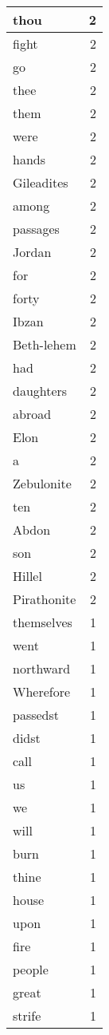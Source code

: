 \begin{center}
\begin{longtable}{l|r}
thou & 2\\ \hline 
fight & 2\\ \hline 
go & 2\\ \hline 
thee & 2\\ \hline 
them & 2\\ \hline 
were & 2\\ \hline 
hands & 2\\ \hline 
Gileadites & 2\\ \hline 
among & 2\\ \hline 
passages & 2\\ \hline 
Jordan & 2\\ \hline 
for & 2\\ \hline 
forty & 2\\ \hline 
Ibzan & 2\\ \hline 
Beth-lehem & 2\\ \hline 
had & 2\\ \hline 
daughters & 2\\ \hline 
abroad & 2\\ \hline 
Elon & 2\\ \hline 
a & 2\\ \hline 
Zebulonite & 2\\ \hline 
ten & 2\\ \hline 
Abdon & 2\\ \hline 
son & 2\\ \hline 
Hillel & 2\\ \hline 
Pirathonite & 2\\ \hline 
themselves & 1\\ \hline 
went & 1\\ \hline 
northward & 1\\ \hline 
Wherefore & 1\\ \hline 
passedst & 1\\ \hline 
didst & 1\\ \hline 
call & 1\\ \hline 
us & 1\\ \hline 
we & 1\\ \hline 
will & 1\\ \hline 
burn & 1\\ \hline 
thine & 1\\ \hline 
house & 1\\ \hline 
upon & 1\\ \hline 
fire & 1\\ \hline 
people & 1\\ \hline 
great & 1\\ \hline 
strife & 1\\ \hline 

\end{longtable}
\end{center}

